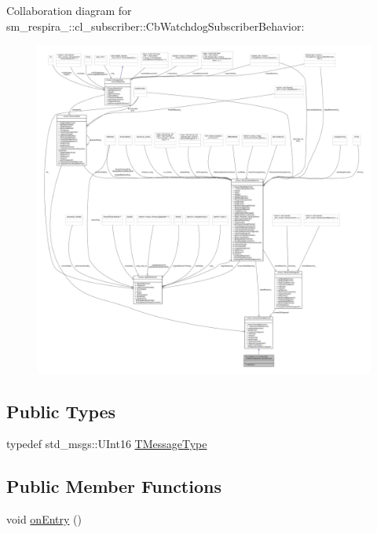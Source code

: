 Collaboration diagram for sm\+\_\+respira\+\_\+:\+:cl\+\_\+subscriber\+:\+:Cb\+Watchdog\+Subscriber\+Behavior\+:
\nopagebreak
\begin{figure}[H]
\begin{center}
\leavevmode
\includegraphics[width=350pt]{classsm__respira__1_1_1cl__subscriber_1_1CbWatchdogSubscriberBehavior__coll__graph}
\end{center}
\end{figure}
\subsection*{Public Types}
\begin{DoxyCompactItemize}
\item 
typedef std\+\_\+msgs\+::\+U\+Int16 \hyperlink{classsm__respira__1_1_1cl__subscriber_1_1CbWatchdogSubscriberBehavior_a75e13b41dd7bdc836b21f2b4cfdd6ad8}{T\+Message\+Type}
\end{DoxyCompactItemize}
\subsection*{Public Member Functions}
\begin{DoxyCompactItemize}
\item 
void \hyperlink{classsm__respira__1_1_1cl__subscriber_1_1CbWatchdogSubscriberBehavior_a46e8bc156a0f8b3bafa2a6d6f02659ec}{on\+Entry} ()
\end{DoxyCompactItemize}


